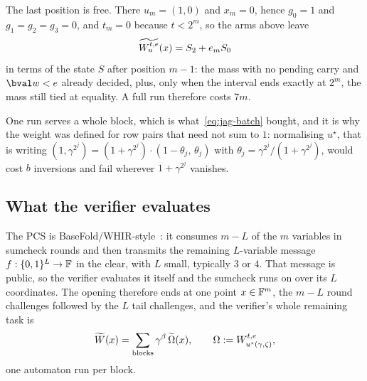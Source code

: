 The last position is free. There $u_m=(1,0)$ and $x_m=0$, hence $g_0=1$ and $g_1=g_2=g_3=0$, and $t_m=0$ because $t<2^m$, so the arms above leave
\begin{equation}
  \widetilde{W^{t,e}_u}(x)=S_2+e_mS_0
  \label{eq:jag-accept}
\end{equation}
in terms of the state $S$ after position $m-1$: the mass with no pending carry and $\bval w<e$ already decided, plus, only when the interval ends exactly at $2^m$, the mass still tied at equality. A full run therefore costs $7m$.

One run serves a whole block, which is what~\eqref{eq:jag-batch} bought, and it is why the weight was defined for row pairs that need not sum to $1$: normalising $u^{\star}$, that is writing $(1,\gamma^{2^j})=(1+\gamma^{2^j})\cdot(1-\theta_j,\,\theta_j)$ with $\theta_j=\gamma^{2^j}/(1+\gamma^{2^j})$, would cost $b$ inversions and fail wherever $1+\gamma^{2^j}$ vanishes.

\subsection{What the verifier evaluates}\label{jag:evaluate}

The PCS is BaseFold/WHIR-style~\cite{NA25,ACFY25}: it consumes $m-L$ of the $m$ variables in sumcheck rounds and then transmits the remaining $L$-variable message $f:\{0,1\}^{L}\to\mathbb{F}$ in the clear, with $L$ small, typically $3$ or $4$. That message is public, so the verifier evaluates it itself and the sumcheck runs on over its $L$ coordinates. The opening therefore ends at one point $x\in\mathbb{F}^m$, the $m-L$ round challenges followed by the $L$ tail challenges, and the verifier's whole remaining task is
\[
  \widetilde{W}(x)=\sum_{\text{blocks}}\gamma^{\beta}\,\widetilde{\Omega}(x),
  \qquad \Omega:=W^{t,e}_{u^{\star}(\gamma,\zeta)},
\]
one automaton run per block.

\medskip
\noindent{}


